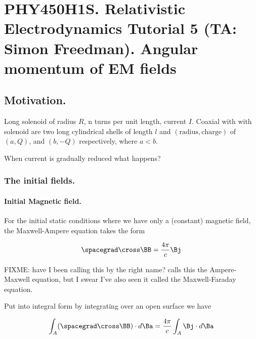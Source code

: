 
%

\chapter{PHY450H1S.  Relativistic Electrodynamics Tutorial 5 (TA: Simon Freedman).  Angular momentum of EM fields}
\label{chap:relativisticElectrodynamicsT5}
{}
\date{Mar 10, 2011}

\beginArtWithToc

\section{Motivation.}

Long solenoid of radius $R$, n turns per unit length, current $I$.  Coaxial with with solenoid are two long cylindrical shells of length $l$ and $(\text{radius},\text{charge})$ of $(a, Q)$, and $(b, -Q)$ respectively, where $a < b$.

When current is gradually reduced what happens?

\subsection{The initial fields.}
\subsubsection{Initial Magnetic field.}

For the initial static conditions where we have only a (constant) magnetic field, the Maxwell-Ampere equation takes the form

\begin{equation}\label{eqn:relativisticElectrodynamicsT5:10}
\spacegrad \cross \BB = \frac{4 \pi}{c} \Bj
\end{equation}

FIXME: have I been calling this by the right name?  \cite{fleisch2007ssg} calls this the Ampere-Maxwell equation, but I swear I've also seen it called the Maxwell-Faraday equation.

Put into integral form by integrating over an open surface we have

\begin{equation}\label{eqn:relativisticElectrodynamicsT5:30}
\int_A (\spacegrad \cross \BB) \cdot d\Ba = \frac{4 \pi}{c} \int_A \Bj \cdot d\Ba
\end{equation}

